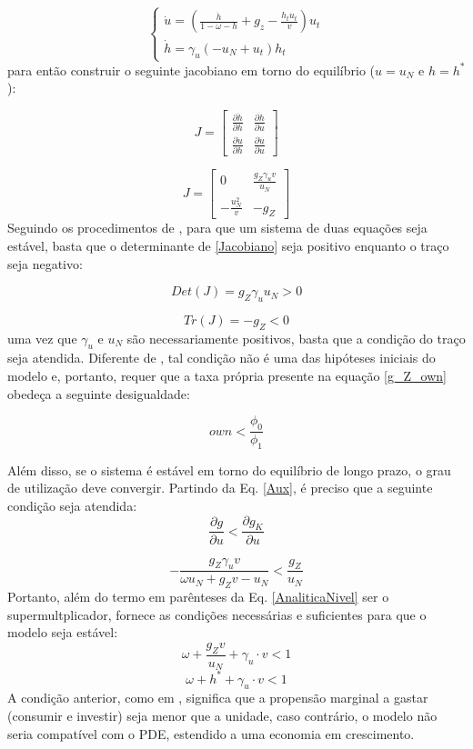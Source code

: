 $$
\begin{cases}
\dot u = \left(\frac{\dot h}{1 - \omega - h} + g_z - \frac{h_t u_t}{v}\right) u_t\\
\dot h = \gamma_{u} \left(- u_N + u_t\right) h_t
\end{cases}
$$
para então construir o seguinte jacobiano em torno do equilíbrio ($u = u_N$ e $h = h^*$):

$$
J = 
\left[\begin{matrix}
\frac{\partial \dot h}{\partial h} & \frac{\partial \dot h}{\partial u}\\
\frac{\partial \dot u}{\partial h} & \frac{\partial \dot u}{\partial u}
\end{matrix}\right]
$$

\begin{equation}
J = 
\label{Jacobiano}
\left[\begin{matrix}0 & \frac{g_Z \gamma_{u} v}{u_N}\\- \frac{u_N^{2}}{v} & - g_Z\end{matrix}\right]
\end{equation}
Seguindo os procedimentos de \textcite{gandolfo_economic_2010}, para que um sistema de duas equações seja estável, basta que o determinante de \ref{Jacobiano} seja positivo enquanto o traço seja negativo:

$$
Det(J) = g_Z \gamma_{u} u_N > 0
$$

$$
Tr(J) = -g_Z < 0
$$
uma vez que $\gamma_u$ e $u_N$ são necessariamente positivos, basta que a condição do traço seja atendida. Diferente de \textcite{freitas_growth_2015}, tal condição não é uma das hipóteses iniciais do modelo e, portanto, requer que a taxa própria presente na equação \ref{g_Z_own} obedeça a seguinte desigualdade:

\begin{equation}
own < \frac{\phi_0}{\phi_1}
\end{equation}

Além disso, se o sistema é estável em torno do equilíbrio de longo prazo, o grau de utilização deve convergir. Partindo da Eq. \ref{Aux}, é preciso que a seguinte condição seja atendida:
$$
\frac{\partial g}{\partial u} < \frac{\partial g_K}{\partial u}
$$

$$
- \frac{g_Z \gamma_{u} v}{\omega u_N + g_Z v - u_N} < \frac{g_Z}{u_N}
$$
Portanto, além do termo em parênteses da Eq. \ref{AnaliticaNivel} ser o supermultplicador, fornece as condições necessárias e suficientes para que o modelo seja estável: 
$$
\omega + \frac{g_Z v}{u_N} + \gamma_u\cdot v < 1
$$
\begin{equation}
\omega + h^*+ \gamma_u\cdot v < 1
\end{equation}
A condição anterior, como em \textcite{freitas_growth_2015}, significa que a propensão marginal a gastar (consumir e investir) seja menor que a unidade, caso contrário, 
o modelo não seria compatível com o PDE, estendido a uma economia em crescimento.


